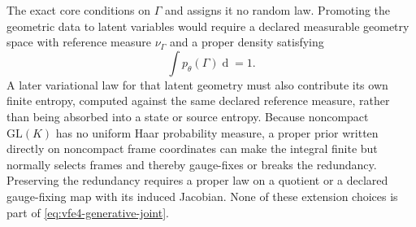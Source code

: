 The exact core conditions on $\Gamma$ and assigns it no random law.  Promoting the geometric data to latent variables would require a declared measurable geometry space with reference measure $\nu_\Gamma$ and a proper density satisfying
\begin{equation}
\int p_\theta(\Gamma)\mathop{\mathrm d\nu_\Gamma(\Gamma)}=1.
\label{eq:proper-latent-geometry-prior}
\end{equation}
A later variational law for that latent geometry must also contribute its own finite entropy, computed against the same declared reference measure, rather than being absorbed into a state or source entropy.  Because noncompact $\mathrm{GL}(K)$ has no uniform Haar probability measure, a proper prior written directly on noncompact frame coordinates can make the integral finite but normally selects frames and thereby gauge-fixes or breaks the redundancy. Preserving the redundancy requires a proper law on a quotient or a declared gauge-fixing map with its induced Jacobian. None of these extension choices is part of \cref{eq:vfe4-generative-joint}.
